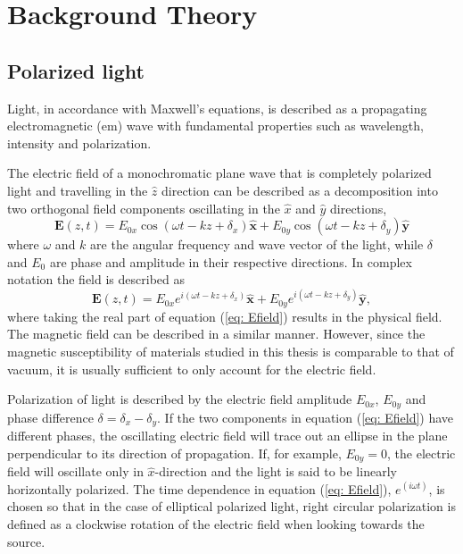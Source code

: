 
\chapter{Background Theory}

\section{Polarized light}
\label{sec:PolarizedLight} %
Light, in accordance with Maxwell's equations, is described as a propagating electromagnetic (\ac{em}) wave with fundamental properties such as wavelength, intensity and polarization. 

The electric field of a monochromatic plane wave that is completely polarized light and travelling in the $\hat{z}$ direction can be described as a decomposition into two orthogonal field components oscillating in the $\hat{x}$ and $\hat{y}$ directions,
\begin{equation}
    \mathbf{E}(z,t) = E_{0x}\cos(\omega t - kz + \delta_x)\mathbf{\hat{x}} + E_{0y}\cos(\omega t - kz + \delta_y)\mathbf{\hat{y}}
    \label{eq:cosEfield}
\end{equation} 
where $\omega$ and $k$ are the angular frequency and wave vector of the light, while $\delta$ and $E_0$ are phase and amplitude in their respective directions. In complex notation the field is described as
\begin{equation}
    \mathbf{E}(z,t) = E_{0x}e^{i(\omega t - kz + \delta_x)}\mathbf{\hat{x}} + E_{0y}e^{i(\omega t - kz + \delta_y)}\mathbf{\hat{y}},
    \label{eq: Efield}
\end{equation}
where taking the real part of equation (\ref{eq: Efield}) results in the physical field. The magnetic field can be described in a similar manner. However, since the magnetic susceptibility of materials studied in this thesis is comparable to that of vacuum, it is usually sufficient to only account for the electric field. 

Polarization of light is described by the electric field amplitude $E_{0x}$, $E_{0y}$ and phase difference $\delta = \delta_x-\delta_y$. If the two components in equation (\ref{eq: Efield}) have different phases, the oscillating electric field will trace out an ellipse in the plane perpendicular to its direction of propagation. If, for example, $E_{0y}=0$, the electric field will oscillate only in $\hat{x}$-direction and the light is said to be linearly horizontally polarized\cite{collett}. The time dependence in equation (\ref{eq: Efield}), $e^{(i\omega t)}$, is chosen so that in the case of elliptical polarized light, right circular polarization is defined as a clockwise rotation of the electric field when looking towards the source\cite{hauge}.


